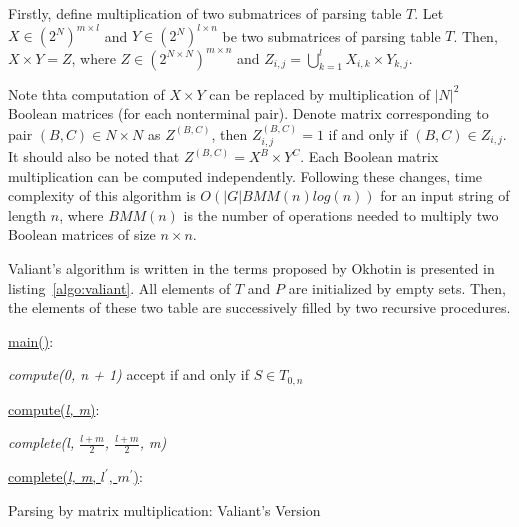 Firstly, define multiplication of two submatrices of parsing table $T$.
Let $X \in (2^N)^{m \times l}$ and $Y \in (2^N)^{l \times n}$ be two submatrices of parsing table $T$. Then, $X \times Y = Z$, where $Z \in (2^{N \times N})^{m \times n}$ and $Z_{i, j} = \bigcup\limits_{k = 1}^{l} X_{i, k} \times Y_{k, j}$.

Note thta computation of $X \times Y$  can be replaced by multiplication of $|N|^2$ Boolean matrices (for each nonterminal pair).
Denote matrix corresponding to pair $(B, C) \in N \times N$ as $Z^{(B, C)}$, then $Z_{i, j}^{(B, C)} = 1$ if and only if $(B, C) \in Z_{i, j}$.
It should also be noted that $Z^{(B, C)} = X^{B} \times Y^{C}$.
Each Boolean matrix multiplication can be computed independently.
Following these changes, time complexity of this algorithm is $O(|G|BMM(n)log(n))$ for an input string of length $n$, where $BMM(n)$ is the number of operations needed to multiply two Boolean matrices of size $n \times n$.

Valiant's algorithm is written in the terms proposed by Okhotin is presented in listing~\ref{algo:valiant}.
All elements of $T$ and $P$ are initialized by empty sets.
Then, the elements of these two table are successively filled by two recursive procedures.

\begin{algorithm}[h]
\SetAlgoNoLine
{}
\underline{main()}{:}{

 \textit{compute(0, n + 1)\;}
 accept if and only if $S \in T_{0, n}$
 \linebreak
 }

\underline{compute(\textit{l, m})}{:}{

 \textit{complete(l, $\frac{l+m}{2}$, $\frac{l+m}{2}$, m)}
 \linebreak
 }

\underline{complete(\textit{l, m}, $l^\prime$, $m^\prime$)}{:}{

 }
\caption{Parsing by matrix multiplication: Valiant's Version}
\label{algo:valiant}
\end{algorithm}

